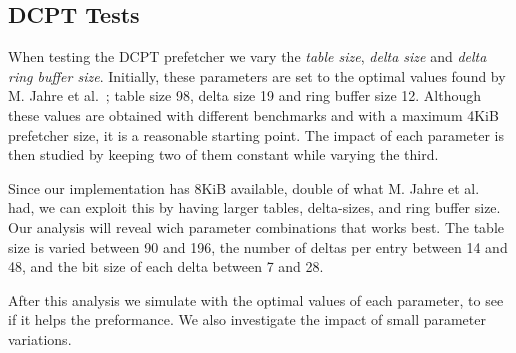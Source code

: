 \subsection{DCPT Tests}

When testing the DCPT prefetcher we vary the \emph{table size}, \emph{delta
size} and \emph{delta ring buffer size}. Initially, these parameters are set 
to the optimal values found by M. Jahre et
al.~\cite{dcpt}; table size 98, delta size 19 and ring buffer size 12. Although
these values are obtained with different benchmarks and with a maximum 4KiB
prefetcher size, it is a reasonable starting point. The impact of each parameter
is then studied by keeping two of them constant while varying the third.

Since our implementation has 8KiB available, double of what M. Jahre et
al.~\cite{dcpt} had, we can exploit this by having larger tables, delta-sizes,
and ring buffer size. Our analysis will reveal wich parameter combinations that
works best. The table size is varied between 90 and 196, the number of deltas per 
entry between 14 and 48, and the bit size of each delta between 7 and 28.

After this analysis we simulate with the optimal values of each parameter, to
see if it helps the preformance. We also investigate the impact of small 
parameter variations. 
